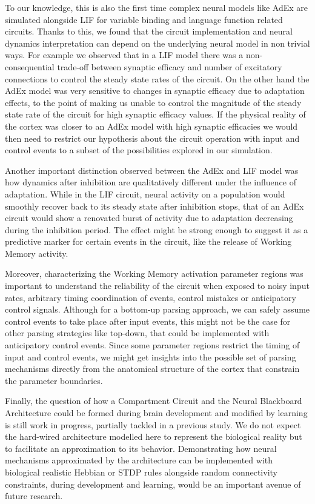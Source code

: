 \documentclass[10pt]{article}
\begin{document}
To our knowledge, this is also the first time complex neural models like AdEx are simulated alongside LIF for variable binding and language function related circuits.
Thanks to this, we found that the circuit implementation and neural dynamics interpretation can depend on the underlying neural model in non trivial ways.
For example we observed that in a LIF model there was a non-consequential trade-off between synaptic efficacy and number of excitatory connections to control the steady state rates of the circuit.
On the other hand the AdEx model was very sensitive to changes in synaptic efficacy due to adaptation effects, to the point of making us unable to control the magnitude of the steady state rate of the circuit for high synaptic efficacy values.
If the physical reality of the cortex was closer to an AdEx model with high synaptic efficacies we would then need to restrict our hypothesis about the circuit operation with input and control events to a subset of the possibilities explored in our simulation.

Another important distinction observed between the AdEx and LIF model was how dynamics after inhibition are qualitatively different under the influence of adaptation.
While in the LIF circuit, neural activity on a population would smoothly recover back to its steady state after inhibition stops, that of an AdEx circuit would show a renovated burst of activity due to adaptation decreasing during the inhibition period.
The effect might be strong enough to suggest it as a predictive marker for certain events in the circuit, like the release of Working Memory activity.

Moreover, characterizing the Working Memory activation parameter regions was important to understand the reliability of the circuit when exposed to noisy input rates, arbitrary timing coordination of events, control mistakes or anticipatory control signals.
Although for a bottom-up parsing approach, we can safely assume control events to take place after input events, this might not be the case for other parsing strategies like top-down, that could be implemented with anticipatory control events.
Since some parameter regions restrict the timing of input and control events, we might get insights into the possible set of parsing mechanisms directly from the anatomical structure of the cortex that constrain the parameter boundaries.

Finally, the question of how a Compartment Circuit and the Neural Blackboard Architecture could be formed during brain development and modified by learning is still work in progress, partially tackled in a previous study\cite{van_der_Velde_2011}.
We do not expect the hard-wired architecture modelled here to represent the biological reality but to facilitate an approximation to its behavior.
Demonstrating how neural mechanisms approximated by the architecture can be implemented with biological realistic Hebbian or STDP rules alongside random connectivity constraints, during development and learning, would be an important avenue of future research.
\end{document}
